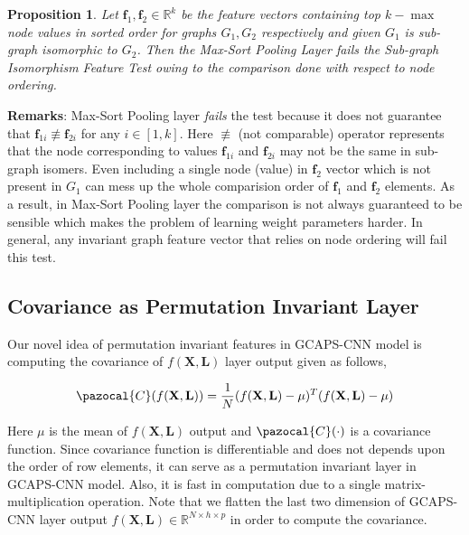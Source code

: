 \documentclass{article}
\newtheorem{prop}{Proposition}
\newcommand{\Ca}{\pazocal{C}}
\begin{document}
\begin{prop}\label{prop:isomorphic-test} Let $\mathbf{f}_1,  \mathbf{f}_2\in \mathbb{R}^k$ be the feature vectors containing top $k-\max$ node values in   sorted order for graphs $G_1, G_2$ respectively and given $G_1$ is sub-graph isomorphic to $G_2$. Then the Max-Sort Pooling Layer \emph{fails} the Sub-graph Isomorphism Feature Test owing to the comparison done with respect to node ordering.
\end{prop}

\noindent\textbf{Remarks}: Max-Sort Pooling layer  \emph{fails} the test because it does not guarantee that  $\mathbf{f}_{1i} \not\equiv \mathbf{f}_{2i}$ for any $i \in [1, k]$. Here  $ \not\equiv$ (not comparable) operator represents that the node corresponding to values $\mathbf{f}_{1i}$ and $\mathbf{f}_{2i}$  may not be the same in sub-graph isomers. Even including a single node (value) in $\mathbf{f}_2$ vector which is not present in $G_1$ can mess up the whole comparision order of  $\mathbf{f}_1$ and $\mathbf{f}_2$ elements.  As a result, in  Max-Sort Pooling layer the comparison is not always guaranteed to be sensible  which makes the problem of  learning  weight parameters harder. In general, any  invariant graph feature vector that relies on node ordering will fail this test.

\subsection{Covariance as Permutation Invariant Layer}
Our novel idea of   permutation invariant features in GCAPS-CNN model is  computing the covariance of $f(\mathbf{X}, \mathbf{L})$  layer output  given as follows,

\begin{equation}\label{eq:cov}
\begin{split}
\Ca(f(\mathbf{X}, \mathbf{L})) & =  \frac{1}{N}(f(\mathbf{X}, \mathbf{L})-\mu)^{T} (f(\mathbf{X}, \mathbf{L})-\mu)  \\
\end{split}
\end{equation}

Here $\mu$ is the mean of  $f(\mathbf{X}, \mathbf{L}) $ output and $\Ca(\cdot)$ is a   covariance function. Since covariance function is differentiable and does not depends upon the order of row elements,  it can serve as a permutation invariant layer in  GCAPS-CNN model. Also, it is fast in computation due to a single matrix-multiplication operation. Note that we flatten the last two dimension of GCAPS-CNN layer output   $f(\mathbf{X}, \mathbf{L}) \in \mathbb{R}^{N \times h\times p}  $ in order to compute the   covariance.
\end{document}

